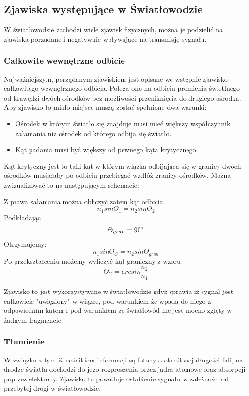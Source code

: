 \documentclass[paper=a4, fontsize=11pt]{scrartcl} %
\numberwithin{equation}{section} %
\numberwithin{figure}{section} %
\numberwithin{table}{section} %
\begin{document}
\subsection{Zjawiska występujące w Światłowodzie}

W światłowodzie zachodzi wiele zjawisk fizycznych, można je podzielić na zjawiska porządane i negatywnie wpływające na transmisję sygnału.

\subsubsection{Całkowite wewnętrzne odbicie}

Najważniejszym, porządanym zjawiskiem jest opisane we wstępnie zjawisko całkowitego wewnętrznego odbicia. Polega ono na odbiciu promienia świetlnego od
krawędzi dwóch ośrodków bez możliwości przeniknięcia do drugiego ośrodka. Aby zjawisko to miało miejsce muszą zostać spełnione dwa warunki:
\begin{itemize}
  \item Ośrodek w którym światło się znajduje musi mieć większy współczynnik załamania niż ośrodek od którego odbija się światło.
  \item Kąt padania musi być większy od pewnego kąta krytycznego.
\end{itemize}

Kąt krytyczny jest to taki kąt w którym wiązka odbijająca się w granicy dwóch ośrodków musiałaby po odbiciu przebiegać wzdłóż granicy ośrodków.
Można zwizualizować to na następującym schemacie:

Z prawa załamania można obliczyć zatem kąt odbicia.\[n_1sin\Theta_1=n_2sin\Theta_2\] 
Podkładając \[\Theta_{gran}=90\degree\] 
Otrzymujemy: \[n_1sin\Theta_C=n_2sin\Theta_{gran}\]
Po przekształceniu możemy wyliczyć kąt graniczny z wzoru \[\Theta_C=arcsin\frac{n_2}{n_1}\]

Zjawisko to jest wykorzystywane w światłowodzie gdyż sprawia iż sygnał jest całkowicie "uwięziony" w wiązce, pod warunkiem że wpada do niego
z odpowiednim kątem i pod warunkiem że światłowód nie jest mocno zgięty w żadnym fragmencie.

\subsubsection{Tłumienie}

W związku z tym iż nośnikiem informacji są fotony o określonej długości fali, na drodze światła dochodzi do jego rozproszenia przez jądra atomowe oraz absorpcji poprzez
elektrony. Zjawisko to powoduje osłabienie sygnału w zależności od przebytej drogi w światłowodzie. 
\end{document}
